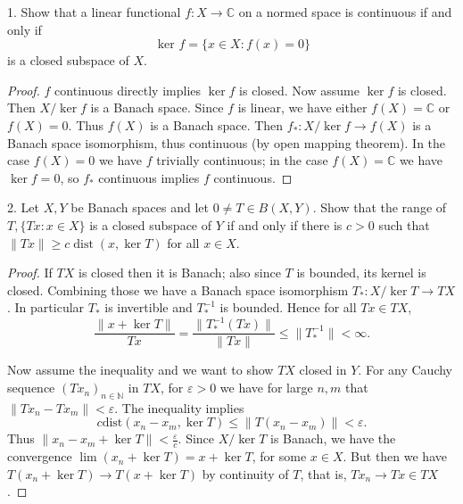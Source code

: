 
\begin{problem}
	
1. Show that a linear functional $f: X \rightarrow \mathbb{C}$ on a normed space is continuous if and only if
\[
\text { ker } f=\{x \in X: f(x)=0\}
\]
is a closed subspace of $X$.
\end{problem}
\begin{proof}
	$f$ continuous directly implies $\operatorname{ker} f$ is closed. Now assume $\operatorname{ker} f$ is closed. Then $X / \operatorname{ker} f$ is a Banach space. Since $f$ is linear, we have either $f(X) = \mathbb{C}$ or $f(X) = 0$. Thus $f(X)$ is a Banach space. Then $f_*: X / \operatorname{ker} f \to f(X)$ is a Banach space isomorphism, thus continuous (by open mapping theorem). In the case $f(X) = 0$ we have $f$ trivially continuous; in the case $f(X) = \mathbb{C}$ we have $\operatorname{ker} f = 0$, so $f_*$ continuous implies $f$ continuous.
\end{proof}

\begin{problem}
	
2. Let $X, Y$ be Banach spaces and let $0 \neq T \in B(X, Y)$. Show that the range of $T,\{T x: x \in X\}$ is a closed subspace of $Y$ if and only if there is $c>0$ such that $\|T x\| \geq c \operatorname{dist}(x, \operatorname{ker} T)$ for all $x \in X$.
\end{problem}
\begin{proof}
	If $TX$ is closed then it is Banach; also since $T$ is bounded, its kernel is closed. Combining those we have a Banach space isomorphism $T_*: X / \operatorname{ker} T \to  TX$. In particular $T_*$ is invertible and $T_*^{-1}$ is bounded. Hence for all $T x \in TX$,
	\[
		\frac{\|x + \operatorname{ker} T\|}{T x} 
		= \frac{\|T_*^{-1}(T x)\|}{\|T x\|} \le \|T_*^{-1}\| < \infty 
	.\] 

	Now assume the inequality and we want to show $TX$ closed in $Y$. For any Cauchy sequence  $(T x_n)_{n \in \mathbb{N}}$ in $TX$, for $\varepsilon>0$ we have for large $n, m$ that $\|T x_n - T x_m\| < \varepsilon$. The inequality implies
	\[
		c \text{dist}(x_n - x_m, \operatorname{ker} T) \le \|T(x_n - x_m)\| < \varepsilon
	.\] 
	Thus
	$\|x_n - x_m + \operatorname{ker} T\| < \frac{\varepsilon}{c}$. Since $X / \operatorname{ker} T$ is Banach, we have the convergence $\lim (x_n + \operatorname{ker} T) = x + \operatorname{ker} T$, for some $x \in X$. But then we have $T(x_n + \operatorname{ker} T) \to T(x + \operatorname{ker} T)$ by continuity of $T$, that is, $T x_n \to  T x \in TX$.
\end{proof}

